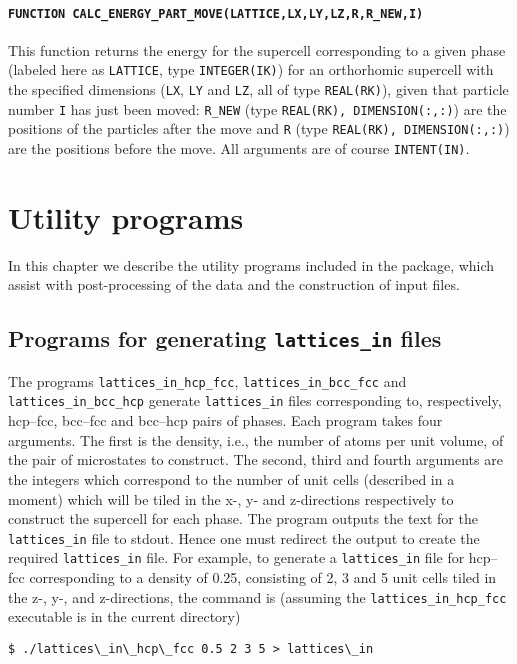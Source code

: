 \documentclass{report}
\begin{document}
\subsubsection{\texttt{FUNCTION CALC\_ENERGY\_PART\_MOVE(LATTICE,LX,LY,LZ,R,R\_NEW,I)}}
This function returns the energy for the supercell corresponding to a given phase (labeled here as \verb|LATTICE|, type \verb|INTEGER(IK)|) for 
an orthorhomic supercell with the specified dimensions (\verb|LX|, \verb|LY| and \verb|LZ|, all of type \verb|REAL(RK)|), given that particle
number \verb|I| has just been moved: \verb|R_NEW| (type \verb|REAL(RK), DIMENSION(:,:)|) are the positions of the particles after the move
and \verb|R| (type \verb|REAL(RK), DIMENSION(:,:)|) are the positions before the move. All arguments are of course \verb|INTENT(IN)|. 




\chapter{Utility programs}\label{chapter:utility_programs}
In this chapter we describe the utility programs included in the package, which assist with post-processing of the data and the construction
of input files.

\section{Programs for generating \texttt{lattices\_in} files}
The programs \texttt{lattices\_in\_hcp\_fcc}, \texttt{lattices\_in\_bcc\_fcc} and \texttt{lattices\_in\_bcc\_hcp} generate \texttt{lattices\_in} 
files corresponding to, respectively, hcp--fcc, bcc--fcc and bcc--hcp pairs of phases.
Each program takes four arguments. The first is the density, i.e., the number of atoms per unit volume, of the pair of microstates to
construct. The second, third and fourth arguments are the integers which correspond
to the number of unit cells (described in a moment) which will be tiled in the x-, y- and z-directions respectively to construct the
supercell for each phase. The program outputs the text for the \texttt{lattices\_in} file to stdout. Hence one must redirect the output
to create the required \texttt{lattices\_in} file.
For example, to generate a \texttt{lattices\_in} file for hcp--fcc corresponding to a density of 0.25, consisting
of 2, 3 and 5 unit cells tiled in the z-, y-, and z-directions, the command is (assuming the \texttt{lattices\_in\_hcp\_fcc} executable
is in the current directory)
\begin{verbatim}
$ ./lattices\_in\_hcp\_fcc 0.5 2 3 5 > lattices\_in
\end{verbatim}
\end{document}
